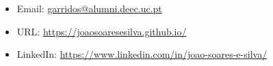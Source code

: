 \documentclass[10pt,a4paper,oneside]{article}
\newlength{\datewidth}
\newlength{\textindent}
\begin{document}
	
	
	\vspace{5mm}
	
	\begin{itemize}
		\item[\hspace{\datewidth}] \parbox[t]{\dimexpr\linewidth-\datewidth-\textindent}{Email: \href{mailto:garridos@alumni.deec.uc.pt}{garridos@alumni.deec.uc.pt}}
		\item[\hspace{\datewidth}] \parbox[t]{\dimexpr\linewidth-\datewidth-\textindent}{URL: \url{https://joaosoaresesilva.github.io/}}
		\item[\hspace{\datewidth}] \parbox[t]{\dimexpr\linewidth-\datewidth-\textindent}{LinkedIn: \url{https://www.linkedin.com/in/joao-soares-e-silva/}}
	\end{itemize}
\end{document}
